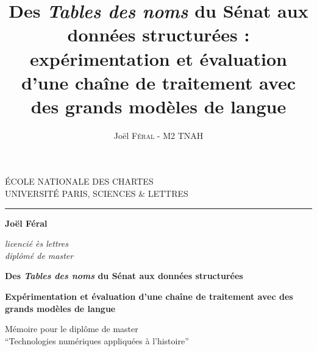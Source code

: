 \documentclass[12pt,twoside]{book}
\author{Joël \textsc{Féral} - M2 TNAH}
\title{Des \textit{Tables des noms} du Sénat aux données structurées : expérimentation et évaluation d’une chaîne de traitement avec des grands modèles de langue}
\begin{document}
	\begin{titlepage}
		\begin{center}
			
			\bigskip
			
			\begin{large}				
				ÉCOLE NATIONALE DES CHARTES\\
				UNIVERSITÉ PARIS, SCIENCES \& LETTRES
			\end{large}
			\begin{center}\rule{2cm}{0.02cm}\end{center}
			
			\bigskip
			\bigskip
			\bigskip
			\begin{Large}
				\textbf{Joël Féral}\\
			\end{Large}
			\begin{normalsize} \textit{licencié ès lettres}\\
				\textit{diplômé de master}
			\end{normalsize}
			
			\bigskip
			\bigskip
			\bigskip
			
			\begin{Huge}
				\textbf{Des \textit{Tables des noms} du Sénat aux données structurées}\\
			\end{Huge}
			\bigskip
			\bigskip
			\begin{LARGE}
				\textbf{Expérimentation et évaluation d’une chaîne de traitement avec des grands modèles de langue}\\
			\end{LARGE}
			
			\bigskip
			\bigskip
			\bigskip
			\begin{large}
			\end{large}
			\vfill
			
			\begin{large}
				Mémoire 
				pour le diplôme de master \\
				\enquote{Technologies numériques appliquées à l'histoire} \\
			\end{large}
			
		\end{center}
	\end{titlepage}

	\thispagestyle{empty}	
	\cleardoublepage
	
\frontmatter
\end{document}
